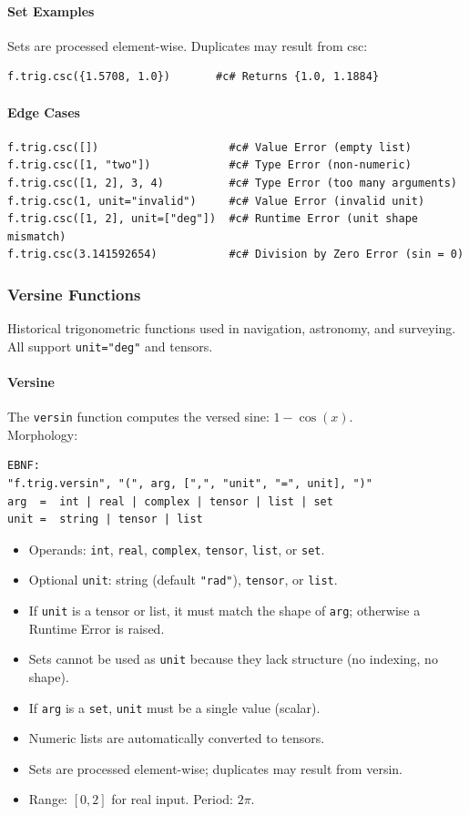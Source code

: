 \paragraph{Set Examples}
Sets are processed element-wise. Duplicates may result from csc:
\begin{verbatim}
f.trig.csc({1.5708, 1.0})       #c# Returns {1.0, 1.1884}
\end{verbatim}

\paragraph{Edge Cases}
\begin{verbatim}
f.trig.csc([])                    #c# Value Error (empty list)
f.trig.csc([1, "two"])            #c# Type Error (non-numeric)
f.trig.csc([1, 2], 3, 4)          #c# Type Error (too many arguments)
f.trig.csc(1, unit="invalid")     #c# Value Error (invalid unit)
f.trig.csc([1, 2], unit=["deg"])  #c# Runtime Error (unit shape mismatch)
f.trig.csc(3.141592654)           #c# Division by Zero Error (sin = 0)
\end{verbatim}

\subsubsection{Versine Functions}
Historical trigonometric functions used in navigation, astronomy, and surveying. All support \texttt{unit="deg"} and tensors.

\paragraph{Versine}
The \texttt{versin} function computes the versed sine: $1 - \cos(x)$.\\
Morphology:
\begin{verbatim}
EBNF:
"f.trig.versin", "(", arg, [",", "unit", "=", unit], ")"
arg  =  int | real | complex | tensor | list | set
unit =  string | tensor | list
\end{verbatim}
\begin{itemize}
\item Operands: \texttt{int}, \texttt{real}, \texttt{complex}, \texttt{tensor}, \texttt{list}, or \texttt{set}.
\item Optional \texttt{unit}: string (default \texttt{"rad"}), \texttt{tensor}, or \texttt{list}.
\item If \texttt{unit} is a tensor or list, it must match the shape of \texttt{arg}; otherwise a Runtime Error is raised.
\item Sets cannot be used as \texttt{unit} because they lack structure (no indexing, no shape).
\item If \texttt{arg} is a \texttt{set}, \texttt{unit} must be a single value (scalar).
\item Numeric lists are automatically converted to tensors.
\item Sets are processed element-wise; duplicates may result from versin.
\item Range: $[0, 2]$ for real input. Period: $2\pi$.
\end{itemize}

